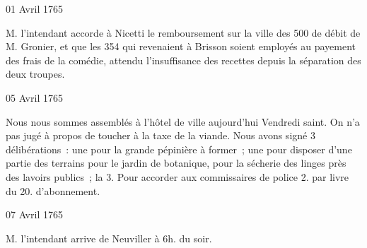                      \begin{diary}{01 Avril 1765}{}
                        
                        
                           M. l'intendant accorde à
                              Nicetti le remboursement
                           sur la ville des 500 de débit de M. Gronier,
                           et que les 354 qui revenaient à Brisson soient
                           employés au payement des frais de la comédie,
                           attendu l'insuffisance des recettes depuis la
                           séparation des deux troupes. \bigskip
        
        
                     \end{diary}
                     \begin{diary}{05 Avril 1765}{}
                        
                         Nous nous sommes assemblés à l'hôtel de
                              ville aujourd'hui Vendredi saint. On n'a pas
                           jugé à propos de toucher à la taxe de la
                           viande. Nous avons signé 3
                           délibérations :
                           une pour la grande
                              pépinière à former ;
                           une pour disposer d'une partie des terrains
                           pour le jardin de
                              botanique, pour la
                              sécherie
                              des linges près des lavoirs publics ; la
                           3. Pour accorder aux commissaires de police 2.
                           par livre du 20. d'abonnement. \bigskip
        
        
                     \end{diary}

                     \begin{diary}{07 Avril 1765}{}
                        
                        
                           M. l'intendant arrive de
                              Neuviller à 6h.
                           du soir. \bigskip
        
        
                     \end{diary}

